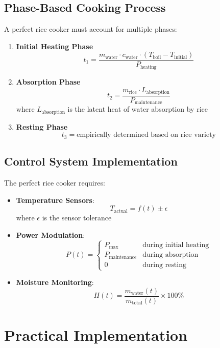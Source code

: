 \documentclass{article}
\begin{document}
\subsection{Phase-Based Cooking Process}
A perfect rice cooker must account for multiple phases:

\begin{enumerate}[label=\roman*.]
    \item \textbf{Initial Heating Phase}
    \[
    t_1 = \frac{m_{\text{water}} \cdot c_{\text{water}} \cdot (T_{\text{boil}} - T_{\text{initial}})}{P_{\text{heating}}}
    \]
    
    \item \textbf{Absorption Phase}
    \[
    t_2 = \frac{m_{\text{rice}} \cdot L_{\text{absorption}}}{P_{\text{maintenance}}}
    \]
    where $L_{\text{absorption}}$ is the latent heat of water absorption by rice
    
    \item \textbf{Resting Phase}
    \[
    t_3 = \text{empirically determined based on rice variety}
    \]
\end{enumerate}

\subsection{Control System Implementation}
The perfect rice cooker requires:

\begin{itemize}
    \item \textbf{Temperature Sensors}:
    \[
    T_{\text{actual}} = f(t) \pm \epsilon
    \]
    where $\epsilon$ is the sensor tolerance
    
    \item \textbf{Power Modulation}:
    \[
    P(t) = \begin{cases}
    P_{\text{max}} & \text{during initial heating} \\
    P_{\text{maintenance}} & \text{during absorption} \\
    0 & \text{during resting}
    \end{cases}
    \]
    
    \item \textbf{Moisture Monitoring}:
    \[
    H(t) = \frac{m_{\text{water}}(t)}{m_{\text{total}}(t)} \times 100\%
    \]
\end{itemize}

\section{Practical Implementation}
\end{document}
